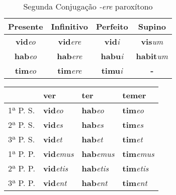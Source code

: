 \documentclass{book}
\newcommand{\radicaldesinencia}[2]{\textbf{#1}\textit{#2}}
\begin{document}
\begin{table}
\centering
\caption{Segunda Conjugação \textit{-ere} paroxítono}
\vspace{0.2cm}
\begin{tabular}{c|c|c|c}
\hline
Presente		&	Infinitivo		&	Perfeito		&	Supino	\\
\hline                                    		
\radicaldesinencia{vid}{eo}	&	\radicaldesinencia{vid}{ere}	&	\radicaldesinencia{vid}{i}	&	\radicaldesinencia{vis}{um}	\\
\radicaldesinencia{hab}{eo}	&	\radicaldesinencia{hab}{ere}	&	\radicaldesinencia{habu}{i}	&	\radicaldesinencia{habit}{um}	\\
\radicaldesinencia{tim}{eo}	&	\radicaldesinencia{tim}{ere}	&	\radicaldesinencia{timu}{i}	&	\radicaldesinencia{-}{}	\\
 \hline
\end{tabular}
\end{table}

\begin{table}
\centering
\begin{tabular}{l|l|l|l}
\hline
 & ver & ter & temer \\
\hline
1ª P. S.	&  \radicaldesinencia{vid}{eo}		& \radicaldesinencia{hab}{eo}		& \radicaldesinencia{tim}{eo} \\
2ª P. S.	&  \radicaldesinencia{vid}{es} 	& \radicaldesinencia{hab}{es}		& \radicaldesinencia{tim}{es} \\
3ª P. S.	&  \radicaldesinencia{vid}{et} 	& \radicaldesinencia{hab}{et}		& \radicaldesinencia{tim}{et} \\
\hline
\hline
1ª P. P.	&  \radicaldesinencia{vid}{emus} 	& \radicaldesinencia{hab}{emus}	& \radicaldesinencia{tim}{emus} \\
2ª P. P. 	&  \radicaldesinencia{vid}{etis} 	& \radicaldesinencia{hab}{etis} 	& \radicaldesinencia{tim}{etis} \\
3ª P. P.	&  \radicaldesinencia{vid}{ent} 	& \radicaldesinencia{hab}{ent}		& \radicaldesinencia{tim}{ent} \\ 
\hline
\end{tabular}
\end{table}
\clearpage
\end{document}
